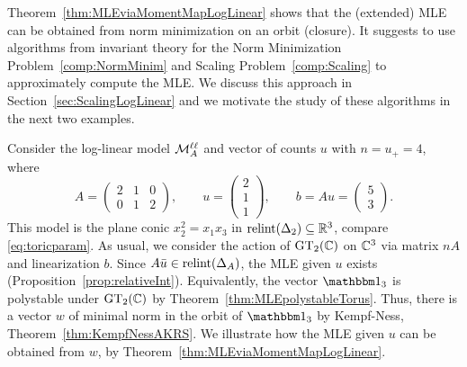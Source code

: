 Theorem~\ref{thm:MLEviaMomentMapLogLinear} shows that the (extended) MLE can be obtained from norm minimization on an orbit (closure). It suggests to use algorithms from invariant theory for the Norm Minimization Problem~\ref{comp:NormMinim} and Scaling Problem~\ref{comp:Scaling} to approximately compute the MLE. We discuss this approach in Section~\ref{sec:ScalingLogLinear} and we motivate the study of these algorithms in the next two examples.

\begin{example}
	\label{ex:loglinear}
	Consider the log-linear model $\mathcal{M}^{\mathtt{\ell \ell}}_A$ and vector of counts $u$ with $n = u_+ = 4$, where
		\[ A = \begin{pmatrix} 2 & 1 & 0 \\ 0 & 1 & 2 \end{pmatrix} , \qquad 
		u = \begin{pmatrix} 2 \\ 1 \\ 1 \end{pmatrix}, \qquad b = Au = \begin{pmatrix} 5 \\ 3 \end{pmatrix}. \]
	This model is the plane conic $x_2^2 = x_1x_3$ in $\operatorname{relint}(\Delta_{2}) \subseteq \mathbb R^3$, compare \eqref{eq:toricparam}. As usual, we consider the action of $\operatorname{GT}_2(\mathbb C)$ on $\mathbb C^3$ via matrix $nA$ and linearization $b$.
	Since $A\bar{u} \in \operatorname{relint}(\Delta_{A})$, the MLE given $u$ exists (Proposition~\ref{prop:relativeInt}). Equivalently, the vector $\ones_3$ is polystable under $\operatorname{GT}_2(\mathbb C)$ by Theorem~\ref{thm:MLEpolystableTorus}. Thus, there is a vector $w$ of minimal norm in the orbit of $\ones_3$ by Kempf-Ness, Theorem~\ref{thm:KempfNessAKRS}. We illustrate how the MLE given $u$ can be obtained from $w$, by Theorem~\ref{thm:MLEviaMomentMapLogLinear}.
	

\end{example}
